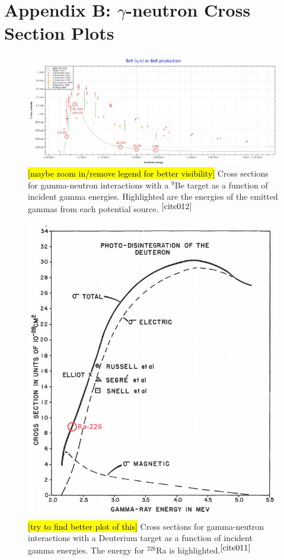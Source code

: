 \documentclass[%
12pt,
twoside,
reprint,
amsmath,amssymb,
aps,
]{article}
\begin{document}
	\section*{Appendix B: $\gamma$-neutron Cross Section Plots}
	
	\begin{figure}[H]
		\includegraphics[scale = 0.35, center]{Images/elements_be_plot.png}
		\caption{\label{tab:table-name} \hl{[maybe zoom in/remove legend for better visibility]} Cross sections for gamma-neutron interactions with a $^{9}$Be target as a function of incident gamma energies. Highlighted are the energies of the emitted gammas from each potential source. $^{\cite{cite012}}$}
	\end{figure}

	\begin{figure}[H]
		\includegraphics[scale = 0.35, center]{Images/deuterium_cross_section_elements.png}
		\caption{\label{tab:table-name} \hl{[try to find better plot of this]} Cross sections for gamma-neutron interactions with a Deuterium target as a function of incident gamma energies. The energy for $^{226}$Ra is highlighted.$^{\cite{cite011}}$}
	\end{figure}

\end{document}
